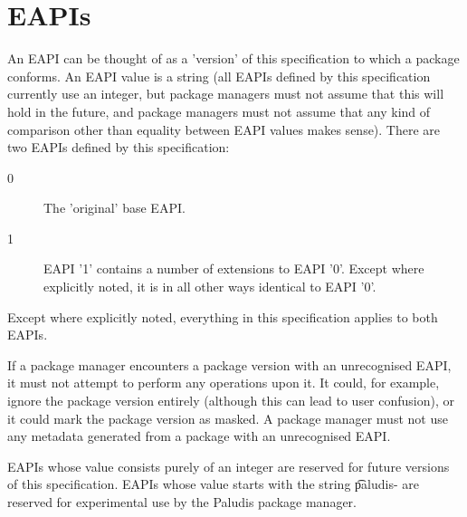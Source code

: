 \section{EAPIs}

An EAPI can be thought of as a 'version' of this specification to which a package conforms. An EAPI
value is a string (all EAPIs defined by this specification currently use an integer, but package
managers must not assume that this will hold in the future, and package managers must not assume
that any kind of comparison other than equality between EAPI values makes sense). There are two
EAPIs defined by this specification:

\begin{description}
\item[0] The 'original' base EAPI.
\item[1] EAPI '1' contains a number of extensions to EAPI '0'. Except where explicitly noted, it is
    in all other ways identical to EAPI '0'.
\end{description}

Except where explicitly noted, everything in this specification applies to both EAPIs.

If a package manager encounters a package version with an unrecognised EAPI, it must not attempt to
perform any operations upon it. It could, for example, ignore the package version entirely (although
this can lead to user confusion), or it could mark the package version as masked. A package manager
must not use any metadata generated from a package with an unrecognised EAPI.

EAPIs whose value consists purely of an integer are reserved for future versions of this
specification. EAPIs whose value starts with the string \t{paludis-} are reserved for experimental
use by the Paludis package manager.

